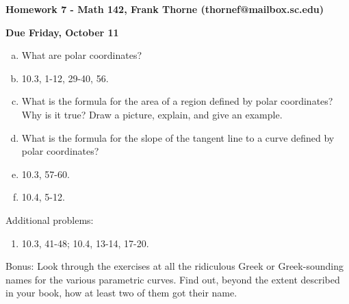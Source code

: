 \documentclass[12pt]{article}
\begin{document}
\setlength{\topmargin}{-2mm}





\begin{center}{\bf Homework 7 - Math 142, Frank Thorne (thornef@mailbox.sc.edu)}
\end{center}
\begin{center}
{\bf Due Friday, October 11}
\end{center}

\begin{enumerate}[(a)]
\item
What are polar coordinates?

\item
10.3, 1-12, 29-40, 56.

\item
What is the formula for the area of a region defined by polar coordinates? Why is it
true? Draw a picture, explain, and give an example.

\item
What is the formula for the slope of the tangent line to a curve defined by polar coordinates? 

\item
10.3, 57-60.

\item
10.4, 5-12.
\end{enumerate}

Additional problems:
\begin{enumerate}
\item
10.3, 41-48; 10.4, 13-14, 17-20.
\end{enumerate}
Bonus: Look through the exercises at all the ridiculous Greek or Greek-sounding
names for the various parametric curves. Find out, beyond the extent described in your
book, how at least two of them got their name.
\end{document}
